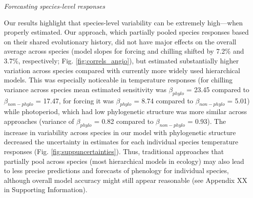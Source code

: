 \documentclass[11pt]{article}
\begin{document}

\emph{Forecasting species-level responses}

Our results highlight that species-level variability can be extremely high---when properly estimated. Our approach, which partially pooled species responses based on their shared evolutionary history, did not have major effects on the overall average across species (model slopes for forcing and chilling shifted by 7.2\% and 3.7\%, respectively; Fig. \ref{fig:correls_angio}), but estimated substantially higher variation across species compared with currently more widely used hierarchical models. This was especially noticeable in temperature responses (for chilling variance across species mean estimated sensitivity was $\beta_{phylo}$ = 23.45 compared to $\beta_{non-phylo}$ = 17.47, for forcing it was $\beta_{phylo}$ = 8.74 compared to $\beta_{non-phylo}$ = 5.01) while photoperiod, which had low phylogenetic structure was more similar across approaches (variance of $\beta_{phylo}$ = 0.82 compared to $\beta_{non-phylo}$ = 0.93). 
The increase in variability across species in our model with phylogenetic structure decreased the uncertainty in estimates for each individual species temperature responses (Fig. \ref{fig:suppuncertainties}). Thus, traditional approaches that partially pool across species (most hierarchical models in ecology) may also lead to less precise predictions and forecasts of phenology for individual species, although overall model accuracy might still appear reasonable (see Appendix XX in Supporting Information).
\end{document}
